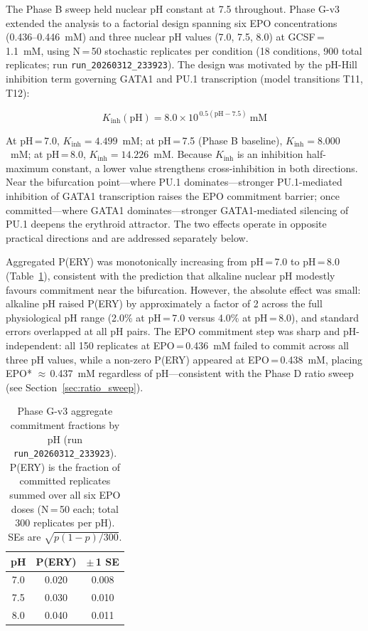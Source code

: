 The Phase B sweep held nuclear pH constant at 7.5 throughout. Phase G-v3 extended the analysis to a factorial design spanning six EPO concentrations (0.436--0.446~mM) and three nuclear pH values (7.0, 7.5, 8.0) at GCSF\,=\,1.1~mM, using N\,=\,50 stochastic replicates per condition (18 conditions, 900 total replicates; run \texttt{run\_20260312\_233923}). The design was motivated by the pH-Hill inhibition term governing GATA1 and PU.1 transcription (model transitions T11, T12):

\begin{equation}
K_{\mathrm{inh}}(\mathrm{pH}) = 8.0 \times 10^{\,0.5(\mathrm{pH} - 7.5)} \ \mathrm{mM}
\label{eq:pHhill}
\end{equation}

\noindent At pH\,=\,7.0, $K_{\mathrm{inh}} = 4.499$~mM; at pH\,=\,7.5 (Phase B baseline), $K_{\mathrm{inh}} = 8.000$~mM; at pH\,=\,8.0, $K_{\mathrm{inh}} = 14.226$~mM. Because $K_{\mathrm{inh}}$ is an inhibition half-maximum constant, a lower value strengthens cross-inhibition in both directions. Near the bifurcation point---where PU.1 dominates---stronger PU.1-mediated inhibition of GATA1 transcription raises the EPO commitment barrier; once committed---where GATA1 dominates---stronger GATA1-mediated silencing of PU.1 deepens the erythroid attractor. The two effects operate in opposite practical directions and are addressed separately below.

Aggregated P(ERY) was monotonically increasing from pH\,=\,7.0 to pH\,=\,8.0 (Table~\ref{tab:phasegv3}), consistent with the prediction that alkaline nuclear pH modestly favours commitment near the bifurcation. However, the absolute effect was small: alkaline pH raised P(ERY) by approximately a factor of 2 across the full physiological pH range (2.0\% at pH\,=\,7.0 versus 4.0\% at pH\,=\,8.0), and standard errors overlapped at all pH pairs. The EPO commitment step was sharp and pH-independent: all 150 replicates at EPO\,=\,0.436~mM failed to commit across all three pH values, while a non-zero P(ERY) appeared at EPO\,=\,0.438~mM, placing EPO* $\approx$\,0.437~mM regardless of pH---consistent with the Phase D ratio sweep (see Section~\ref{sec:ratio_sweep}).

\begin{table}[ht]
\caption{Phase G-v3 aggregate commitment fractions by pH (run \texttt{run\_20260312\_233923}). P(ERY) is the fraction of committed replicates summed over all six EPO doses (N\,=\,50 each; total 300 replicates per pH). SEs are $\sqrt{p(1-p)/300}$.}
\label{tab:phasegv3}
\centering
\small
\begin{tabularx}{\linewidth}{@{}ccc@{}}
\toprule
\textbf{pH} & \textbf{P(ERY)} & \textbf{$\pm$\,1 SE} \\
\midrule
7.0 & 0.020 & 0.008 \\
7.5 & 0.030 & 0.010 \\
8.0 & 0.040 & 0.011 \\
\bottomrule
\end{tabularx}
\end{table}

